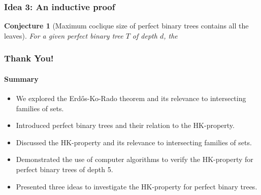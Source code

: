 \documentclass[10pt,]{beamer}
\theoremstyle{conjectureStyle}
\newtheorem*{conjecture}{Conjecture}
\theoremstyle{notationStyle}
\begin{document}
\begin{frame}\frametitle{Idea 3: An inductive proof}
    \begin{conjecture}[Maximum coclique size of perfect binary trees contains all the leaves]
        For a given perfect binary tree $T$ of depth $d$, the
    \end{conjecture}
\end{frame}



\begin{frame}\frametitle{Thank You!}
    \framesubtitle{Summary}
    \begin{itemize}
        \item We explored the Erdős-Ko-Rado theorem and its relevance to intersecting families of sets.
        \item Introduced perfect binary trees and their relation to the HK-property.
        \item Discussed the HK-property and its relevance to intersecting families of sets.
        \item Demonstrated the use of computer algorithms to verify the HK-property for perfect binary trees of depth 5.
        \item Presented three ideas to investigate the HK-property for perfect binary trees.
    \end{itemize}
\end{frame}
\end{document}
